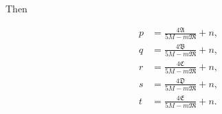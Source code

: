 Then

\[
\begin{aligned}
p &= \frac{4\mathfrak{A}}{5M-m\mathfrak{M}} + n,\\[3pt]
q &= \frac{4\mathfrak{B}}{5M-m\mathfrak{M}} + n,\\[3pt]
r &= \frac{4\mathfrak{C}}{5M-m\mathfrak{M}} + n,\\[3pt]
s &= \frac{4\mathfrak{D}}{5M-m\mathfrak{M}} + n,\\[3pt]
t &= \frac{4\mathfrak{E}}{5M-m\mathfrak{M}} + n.
\end{aligned}
\]

